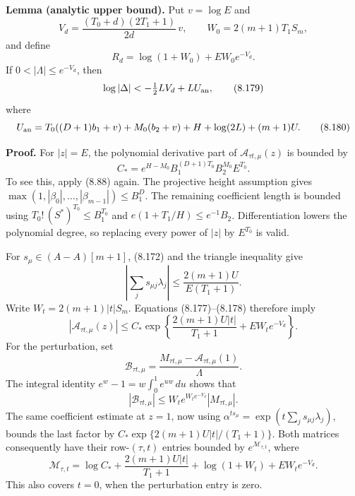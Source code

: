 \documentclass[
  11pt,
  a4paper,
]{article}
\begin{document}
\textbf{Lemma (analytic upper bound).} Put \(v=\log E\) and \[
V_d=\frac{(T_0+d)(2T_1+1)}{2d}\,v,\qquad
W_0=2(m+1)T_1S_m,
\] and define \[
R_d=\log(1+W_0)+EW_0e^{-V_d}.
\] If \(0<|\Lambda|\le e^{-V_d}\), then \[
\log|\Delta|
<-\tfrac12LV_d+LU_{\rm an},
\tag{8.179}
\] where \[
U_{\rm an}=
T_0((D+1)b_1+v)+M_0(b_2+v)
+H+\log(2L)+(m+1)U.
\tag{8.180}
\]

\textbf{Proof.} For \(|z|=E\), the polynomial derivative part of
\(\mathcal A_{\tau t,\mu}(z)\) is bounded by \[
C_*=e^{H-M_0}B_1^{(D+1)T_0}B_2^{M_0}E^{T_0}.
\] To see this, apply (8.88) again. The projective height assumption
gives \(\max(1,|\beta_0|,\ldots,|\beta_{m-1}|)\le B_1^D\). The remaining
coefficient length is bounded using \(T_0!\,(S^*)^{T_0}\le B_1^{T_0}\)
and \(e(1+T_1/H)\le e^{-1}B_2\). Differentiation lowers the polynomial
degree, so replacing every power of \(|z|\) by \(E^{T_0}\) is valid.

For \(s_\mu\in(A-A)[m+1]\), (8.172) and the triangle inequality give \[
\left|\sum_j s_{\mu j}\lambda_j\right|
\le\frac{2(m+1)U}{E(T_1+1)}.
\] Write \(W_t=2(m+1)|t|S_m\). Equations (8.177)--(8.178) therefore
imply \[
|\mathcal A_{\tau t,\mu}(z)|
\le C_*\exp\left\{
\frac{2(m+1)U|t|}{T_1+1}+EW_te^{-V_d}\right\}.
\] For the perturbation, set \[
\mathcal B_{\tau t,\mu}
=\frac{M_{\tau t,\mu}-\mathcal A_{\tau t,\mu}(1)}{\Lambda}.
\] The integral identity \(e^w-1=w\int_0^1e^{uw}\,du\) shows that \[
|\mathcal B_{\tau t,\mu}|
\le W_t e^{W_te^{-V_d}}|M_{\tau t,\mu}|.
\] The same coefficient estimate at \(z=1\), now using
\(\alpha^{ts_\mu}=\exp(t\sum_js_{\mu j}\lambda_j)\), bounds the last
factor by \(C_*\exp\{2(m+1)U|t|/(T_1+1)\}\). Both matrices consequently
have their row-\((\tau,t)\) entries bounded by
\(e^{\mathcal M_{\tau,t}}\), where \[
\mathcal M_{\tau,t}
=\log C_*+\frac{2(m+1)U|t|}{T_1+1}
+\log(1+W_t)+EW_te^{-V_d}.
\] This also covers \(t=0\), when the perturbation entry is zero.
\end{document}
